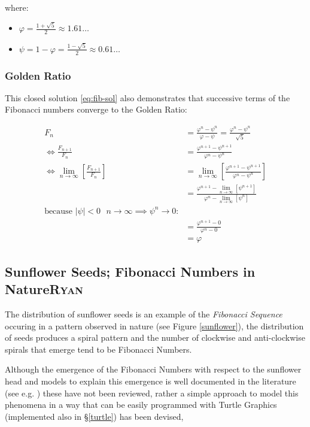 \documentclass[a4paper,11pt,twoside]{article}
\begin{document}
where:

\begin{itemize}
\item \(\varphi = \frac{1+ \sqrt{5} }{2} \approx 1.61\ldots\)
\item \(\psi = 1-\varphi = \frac{1- \sqrt{5} }{2} \approx 0.61\ldots\)
\end{itemize}

\subsubsection{Golden Ratio}
\label{sec:orgfc73884}
This closed solution \eqref{eq:fib-sol} also demonstrates that successive terms of the Fibonacci numbers converge to the Golden Ratio:



\begin{align*}
    F_n &= \frac{\varphi^n-\psi^n}{\varphi-\psi} = \frac{\varphi^n-\psi^n}{\sqrt 5} \\
    \iff \frac{F_{n+1}}{F_n}	&= \frac{\varphi^{n+ 1} - \psi^{n+  1}}{\varphi^{n} - \psi^{n}} \\
    \iff \lim_{n \rightarrow \infty}\left[ \frac{F_{n+1}}{F_n} \right]	&= \lim_{n \rightarrow \infty}\left[ \frac{\varphi^{n+ 1} - \psi^{n+  1}}{\varphi^{n} - \psi^{n}} \right] \\
&= \frac{\varphi^{n+ 1} -\lim_{n \rightarrow \infty}\left[ \psi^{n +  1} \right] }{\varphi^{n} - \lim_{n \rightarrow \infty}\left[ \psi^n \right] } \\
\text{because $\mid \psi \mid < 0$ $n \rightarrow \infty \implies \psi^{n} \rightarrow 0$:} \\
&= \frac{\varphi^{n+  1} -  0}{\varphi^{n} -  0} \\
&= \varphi
\end{align*}

\subsection{Sunflower Seeds; Fibonacci Numbers in Nature\hfill{}\textsc{Ryan}}
\label{sunflower-example}
The distribution of sunflower seeds is an example of the \emph{Fibonacci Sequence}
occuring in a pattern observed in nature (see Figure \ref{sunflower}), the distribution of seeds produces a spiral pattern and the number of clockwise and anti-clockwise spirals that emerge tend to be Fibonacci Numbers. \cite{bohannonSunflowersShowComplex2016}

Although the emergence of the Fibonacci Numbers with respect to the sunflower head and models to explain this emergence is well documented in the literature (see e.g. \cite{ridleyPackingEfficiencySunflower1982,mathaiConstructingSunflowerHead1974,vogelBetterWayConstruct1979}) these have not been reviewed, rather a simple approach to model this phenomena in a way that can be easily programmed with Turtle Graphics (implemented also in \S \ref{turtle}) has been devised,
\end{document}
